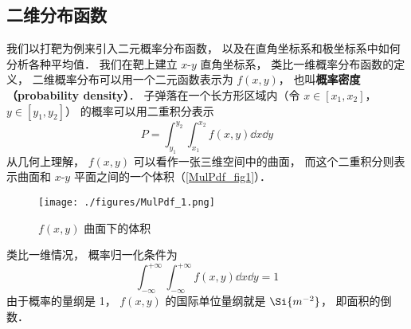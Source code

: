 


\subsection{二维分布函数}
我们以打靶为例来引入二元概率分布函数， 以及在直角坐标系和极坐标系中如何分析各种平均值． 我们在靶上建立 $x$-$y$ 直角坐标系， 类比一维概率分布函数的定义， 二维概率分布可以用一个二元函数表示为 $f(x, y)$， 也叫\textbf{概率密度（probability density）}． 子弹落在一个长方形区域内（令 $x \in [x_1, x_2]$， $y \in [y_1, y_2]$） 的概率可以用二重积分表示
\begin{equation}
P = \int_{y_1}^{y_2} \int_{x_1}^{x_2} f(x, y) \dd{x} \dd{y}
\end{equation}
从几何上理解， $f(x, y)$ 可以看作一张三维空间中的曲面， 而这个二重积分则表示曲面和 $x$-$y$ 平面之间的一个体积（\autoref{MulPdf_fig1}）．

\begin{figure}[ht]
\centering
\texttt{[image: ./figures/MulPdf\_1.png]}
\caption{$f(x, y)$ 曲面下的体积} \label{MulPdf_fig1}
\end{figure}

类比一维情况， 概率归一化条件为
\begin{equation}
\int_{-\infty}^{+\infty} \int_{-\infty}^{+\infty} f(x, y) \dd{x} \dd{y} = 1
\end{equation}
由于概率的量纲是 1， $f(x, y)$ 的国际单位量纲就是 $\Si{m^{-2}}$， 即面积的倒数．


